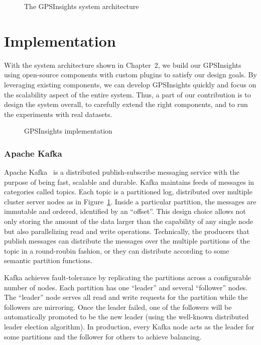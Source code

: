 \documentclass{acm_proc_article-sp}
\begin{document}
\begin{figure}[h]
\centering
{}
\caption{The GPSInsights system architecture}
\label{architecture}
\end{figure}


\section{Implementation} 

With the system architecture shown in Chapter~2, we build our GPSInsights using open-source components with custom plugins to satisfy our design goals. By leveraging existing components, we can develop GPSInsights quickly and focus on the scalability aspect of the entire system. Thus, a part of our contribution is to design the system overall, to carefully extend the right components, and to run the experiments with real datasets.  

\begin{figure}[h]
\centering
{}
\caption{GPSInsights implementation}
\end{figure}

\subsubsection{Apache Kafka} 

Apache Kafka~\cite{kafkapaper,kafkaweb} is a distributed publish-subscribe messaging service with the purpose of being fast, scalable and durable. Kafka maintains feeds of messages in categories called topics. Each topic is a partitioned log, distributed over multiple cluster server nodes as in Figure~\ref{architecture}. Inside a particular partition, the messages are immutable and ordered, identified by an ``offset''. This design choice allows not only storing the amount of the data larger than the capability of any single node but also parallelizing read and write operations. Technically, the producers that publish messages can distribute the messages over the multiple partitions of the topic in a round-roubin fashion, or they can distribute according to some semantic partition functions.

Kafka achieves fault-tolerance by replicating the partitions across a configurable number of nodes. Each partition has one ``leader'' and several ``follower'' nodes. The ``leader'' node serves all read and write requests for the partition while the followers are mirroring. Once the leader failed, one of the followers will be automatically promoted to be the new leader (using the well-known distributed leader election algorithm). In production, every Kafka node acts as the leader for some partitions and the follower for others to achieve balancing. 
\end{document}
